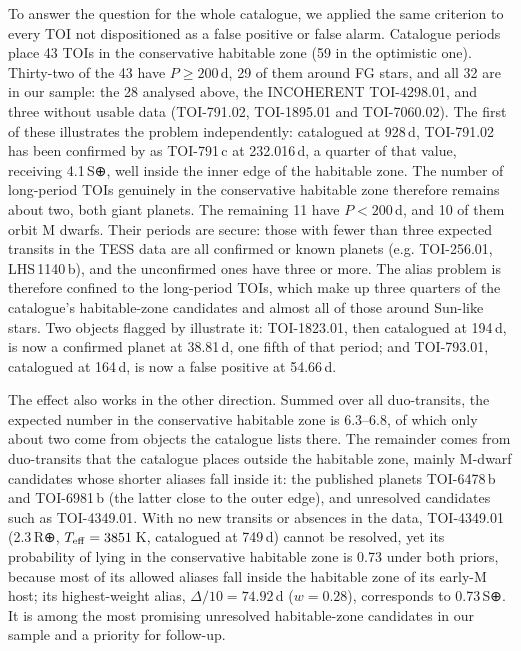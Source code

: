 \documentclass[fleqn,usenatbib]{mnras}
\newcommand{\Teff}{\ensuremath{T_{\rm eff}}}
\begin{document}
To answer the question for the whole catalogue, we applied the same criterion to every TOI not dispositioned as a false positive or false alarm. Catalogue periods place 43 TOIs in the conservative habitable zone (59 in the optimistic one). Thirty-two of the 43 have $P \geq 200$\,d, 29 of them around FG stars, and all 32 are in our sample: the 28 analysed above, the INCOHERENT TOI-4298.01, and three without usable data (TOI-791.02, TOI-1895.01 and TOI-7060.02). The first of these illustrates the problem independently: catalogued at 928\,d, TOI-791.02 has been confirmed by \citet{Dransfield2026} as TOI-791\,c at 232.016\,d, a quarter of that value, receiving 4.1\,S⊕, well inside the inner edge of the habitable zone. The number of long-period TOIs genuinely in the conservative habitable zone therefore remains about two, both giant planets. The remaining 11 have $P < 200$\,d, and 10 of them orbit M dwarfs. Their periods are secure: those with fewer than three expected transits in the TESS data are all confirmed or known planets (e.g. TOI-256.01, LHS\,1140\,b), and the unconfirmed ones have three or more. The alias problem is therefore confined to the long-period TOIs, which make up three quarters of the catalogue's habitable-zone candidates and almost all of those around Sun-like stars. Two objects flagged by \citet{Kaltenegger2021} illustrate it: TOI-1823.01, then catalogued at 194\,d, is now a confirmed planet at 38.81\,d, one fifth of that period; and TOI-793.01, catalogued at 164\,d, is now a false positive at 54.66\,d.

The effect also works in the other direction. Summed over all duo-transits, the expected number in the conservative habitable zone is 6.3--6.8, of which only about two come from objects the catalogue lists there. The remainder comes from duo-transits that the catalogue places outside the habitable zone, mainly M-dwarf candidates whose shorter aliases fall inside it: the published planets TOI-6478\,b and TOI-6981\,b (the latter close to the outer edge), and unresolved candidates such as TOI-4349.01. With no new transits or absences in the data, TOI-4349.01 (2.3\,R⊕, $\Teff = 3851$\,K, catalogued at 749\,d) cannot be resolved, yet its probability of lying in the conservative habitable zone is 0.73 under both priors, because most of its allowed aliases fall inside the habitable zone of its early-M host; its highest-weight alias, $\Delta/10 = 74.92$\,d ($w = 0.28$), corresponds to 0.73\,S⊕. It is among the most promising unresolved habitable-zone candidates in our sample and a priority for follow-up.
\end{document}
